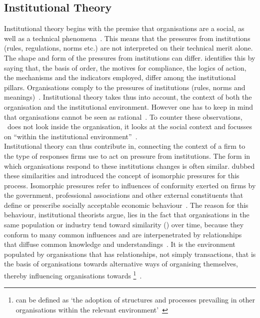 \subsection{Institutional Theory}\label{sec:InstTheory}


Institutional theory begins with the premise that organisations are a social, as well as a technical phenomena~\citep{Westney:2005vv}.
This means that the pressures from institutions (rules, regulations, norms etc.) are not interpreted on their technical merit alone.
The shape and form of the pressures from institutions can differ.
\cite{Scott:2008tk} identifies this by saying that, the basis of order, the motives for compliance, the logics of action, the mechanisms and the indicators employed, differ among the institutional pillars. 
Organisations comply to the pressures of institutions (rules, norms and meanings)~\citep{Scott:2008tk}.
Institutional theory takes thus into account, the context of both the organisation and the institutional environment.
However one has to keep in mind that organisations cannot be seen as rational~\citep{Westney:2005vv}.
To counter these observations, \inth~does not look inside the organisation, it looks at the social context and focusses on ``\iso within the institutional environment''~\citep{Zucker:1987vn,Westney:2005vv}.\\
Institutional theory can thus contribute in, connecting the context of a firm to the type of responses firms use to act on pressure from institutions.
The form in which organisations respond to these institutions changes is often similar.
\cite{DiMaggio:1983wt} dubbed these similarities \iso and introduced the concept of isomorphic pressures for this process.
Isomorphic pressures refer to influences of conformity exerted on firms by the government, professional associations and other external constituents that define or prescribe socially acceptable economic behaviour~\citep{Scott:2001tt}.
The reason for this behaviour, institutional theorists argue, lies in the fact that organisations in the same population or industry tend toward similarity (\isos) over time, because they conform to many common influences and are interpenetrated by relationships that diffuse common knowledge and understandings~\citep{DiMaggio:1983wt,Meyer:1978if,Jepperson:1991tu,Oliver:1988un,Scott:1987uq}.
It is the environment populated by organisations that has relationships, not simply transactions, that is the basis of organisations towards alternative ways of organising themselves, thereby influencing organisations towards \iso\footnote{\iso can be defined as `the adoption of structures and processes prevailing in other organisations within the relevant environment'~\citep{Zucker:1987vn}}~\citep{Westney:2005vv,DiMaggio:1983wt,Zucker:1987vn}. 
